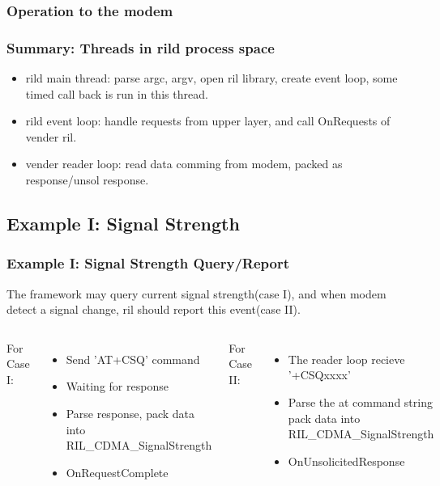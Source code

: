 \documentclass{beamer}
\begin{document}
\begin{frame}
    \frametitle{Operation to the modem}
\end{frame}

\begin{frame}
    \frametitle{Summary: Threads in rild process space}
    \begin{itemize}
        \item rild main thread: parse argc, argv, open ril library, create event loop, some timed call back is run in this thread.
        \item rild event loop: handle requests from upper layer, and call OnRequests of vender ril.
        \item vender reader loop: read data comming from modem, packed as response/unsol response.
    \end{itemize}
\end{frame}

\subsection {Example I: Signal Strength}
\begin{frame}
    \frametitle{Example I: Signal Strength Query/Report}
    The framework may query current signal strength(case I), and when modem detect a signal change, ril should report this event(case II).\\
    \begin{columns}[c]
        \column{2.5in}
        For Case I:
        \begin{itemize}
            \item Send 'AT+CSQ' command
            \item Waiting for response
            \item Parse response, pack data into RIL\_CDMA\_SignalStrength
            \item OnRequestComplete
        \end{itemize}
        \column{2in}
        For Case II:
        \begin{itemize}
            \item The reader loop recieve '+CSQxxxx'
            \item Parse the at command string pack data into RIL\_CDMA\_SignalStrength
            \item OnUnsolicitedResponse
        \end{itemize}
    \end{columns}
\end{frame}
\end{document}
